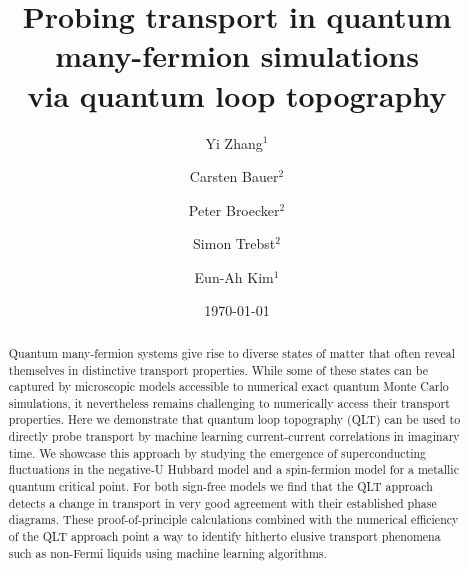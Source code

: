 \documentclass[amsmath,amssymb, aps, prx, longbibliography, twocolumn]{revtex4-1}
\begin{document}
\title{ Probing transport in quantum many-fermion simulations\\ via quantum loop topography}

\author{Yi Zhang$^1$}
\author{Carsten Bauer$^2$}
\author{Peter Broecker$^2$} 
\author{Simon Trebst$^2$}
\author{Eun-Ah Kim$^1$}

%

\date{\today}

\begin{abstract}
Quantum many-fermion systems give rise to diverse states of matter that often reveal themselves in distinctive transport properties. While some of these states can be captured by microscopic models accessible to numerical exact quantum Monte Carlo simulations, it nevertheless remains challenging to  numerically access their transport properties. 
Here we demonstrate that quantum loop topography (QLT) can be used to directly probe transport by machine learning current-current correlations in imaginary time.
We showcase this approach by studying the emergence of superconducting fluctuations in the negative-U Hubbard model and  
a spin-fermion model for a metallic quantum critical point. 
For both sign-free models we find that the QLT approach detects a change in transport in very good agreement with their established 
phase diagrams.
These proof-of-principle calculations combined with the numerical efficiency of the QLT approach point a way to identify hitherto elusive
transport phenomena such as non-Fermi liquids using machine learning algorithms.
\end{abstract}

\maketitle

\end{document}
